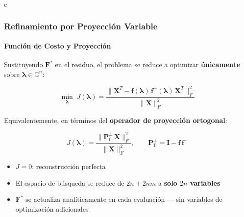 \documentclass{beamer}
\begin{document}
c
\begin{frame}
\frametitle{Refinamiento por Proyección Variable}
\framesubtitle{Función de Costo y Proyección}

Sustituyendo $\mathbf{F}^*$ en el residuo, el problema se reduce a optimizar \textbf{únicamente} sobre $\bm{\lambda} \in \mathbb{C}^n$:

\begin{equation}
    \min_{\bm{\lambda}}\; J(\bm{\lambda}) =
    \frac{\bigl\|\mathbf{X}^T - \mathbf{f}(\bm{\lambda})\,\mathbf{f}^+(\bm{\lambda})\,\mathbf{X}^T\bigr\|_F^2}
         {\|\mathbf{X}\|_F^2}
    \label{eq:varpro_cost}
\end{equation}

Equivalentemente, en términos del \textbf{operador de proyección ortogonal}:

\begin{equation}
    J(\bm{\lambda}) = \frac{\bigl\|\mathbf{P}_{\mathbf{f}}^\perp\,\mathbf{X}\bigr\|_F^2}{\|\mathbf{X}\|_F^2},
    \qquad
    \mathbf{P}_{\mathbf{f}}^\perp = \mathbf{I} - \mathbf{f}\,\mathbf{f}^+
    \label{eq:projection}
\end{equation}

\begin{itemize}
    \item $J = 0$: reconstrucción perfecta
    \item El espacio de búsqueda se reduce de $2n + 2nm$ a \textbf{solo $2n$ variables}
    \item $\mathbf{F}^*$ se actualiza analíticamente en cada evaluación — sin variables de optimización adicionales
\end{itemize}

\end{frame}
\end{document}
